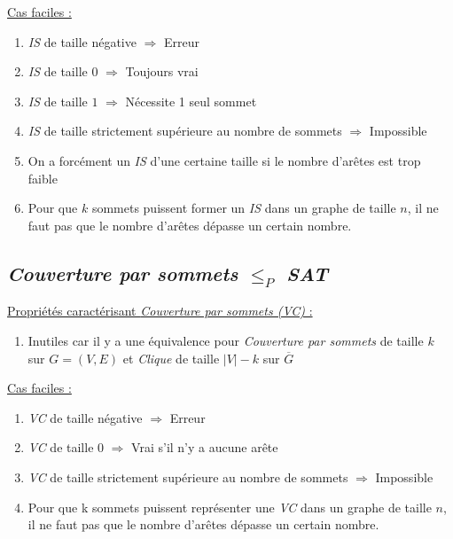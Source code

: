   \underline{Cas faciles :}
  \begin{enumerate}
   \item \emph{IS} de taille négative $\Rightarrow$ Erreur
   \item \emph{IS} de taille $0$ $\Rightarrow$ Toujours vrai
   \item \emph{IS} de taille $1$ $\Rightarrow$ Nécessite 1 seul sommet
   \item \emph{IS} de taille strictement supérieure au nombre de sommets
	 $\Rightarrow$ Impossible
   \item On a forcément un \emph{IS} d'une certaine taille si le nombre
	 d'arêtes est trop faible
   \item Pour que $k$ sommets puissent former un \emph{IS} dans un
	 graphe de taille $n$, il ne faut pas que le nombre d'arêtes
	 dépasse un certain nombre.
  \end{enumerate}

  \subsection{\emph{Couverture par sommets} $\leq_P$ \emph{SAT}}
  \underline{Propriétés caractérisant \emph{Couverture par sommets (VC)}
  :}
  \begin{enumerate}
   \item Inutiles car il y a une équivalence pour \emph{Couverture par
	 sommets} de taille $k$ sur $G = (V,E)$ et \emph{Clique} de
	 taille $|V|-k$ sur $\overline{G}$
  \end{enumerate}

  \underline{Cas faciles :}
  \begin{enumerate}
   \item \emph{VC} de taille négative $\Rightarrow$ Erreur
   \item \emph{VC} de taille $0$ $\Rightarrow$ Vrai s'il n'y a aucune
	 arête
   \item \emph{VC} de taille strictement supérieure au nombre de sommets
	 $\Rightarrow$ Impossible 
   \item Pour que k sommets puissent représenter une \emph{VC} dans un
	 graphe de taille $n$, il ne faut pas que le nombre d'arêtes
	 dépasse un certain nombre.
  \end{enumerate}

